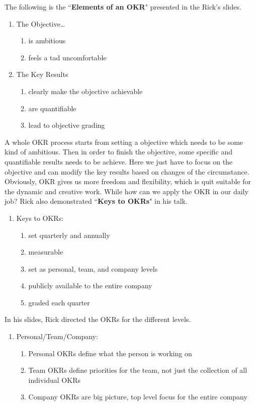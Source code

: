 \documentclass[12pt,onecolumn,a4paper]{IEEEtran}
\begin{document}
The following is the ``\textbf{Elements of an OKR}" presented in the Rick's slides\cite{OKRGV}.\\

\begin{enumerate}
  \item The Objective\ldots
  \begin{enumerate}
    \item is ambitious
    \item feels a tad uncomfortable
  \end{enumerate}
 \item The Key Results
  \begin{enumerate}
    \item clearly make the objective achievable
    \item are quantifiable
    \item lead to objective grading
  \end{enumerate}
\end{enumerate}

A whole OKR process starts from setting a objective which needs to be some kind of ambitious. Then in order to finish the objective, some specific and quantifiable results needs to be achieve. Here we just have to focus on the objective and can modify the key results based on changes of the circumstance. Obviously, OKR gives us more freedom and flexibility, which is quit suitable for the dynamic and creative work. While how can we apply the OKR in our daily job? Rick also demonstrated ``\textbf{Keys to OKRs}" in his talk\cite{OKRGV}.\\

\begin{enumerate}
  \item Keys to OKRs\cite{OKRGV}:
  \begin{enumerate}
    \item set quarterly and annually
    \item measurable
    \item set as personal, team, and company levels
    \item publicly available to the entire company
    \item graded each quarter
  \end{enumerate}
\end{enumerate}

In his slides, Rick directed the OKRs for the different levels\cite{OKRGV}.
\begin{enumerate}
  \item Personal/Team/Company\cite{OKRGV}:
  \begin{enumerate}
    \item Personal OKRs define what the person is working on
    \item Team OKRs define priorities for the team, not just the collection of all individual OKRs
    \item Company OKRs are big picture, top level focus for the entire company
  \end{enumerate}
\end{enumerate}
\end{document}
